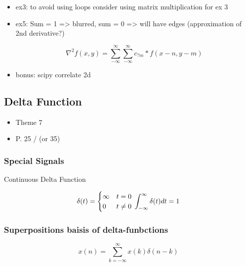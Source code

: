 \documentclass[
]{article}
\author{}
\date{}
\providecommand{\tightlist}{%
  \setlength{\itemsep}{0pt}\setlength{\parskip}{0pt}}
\begin{document}
\begin{itemize}
\item
  ex3: to avoid using loops consider using matrix multiplication for ex
  3
\item
  ex5: Sum = 1 =\textgreater{} blurred, sum = 0 =\textgreater{} will
  have edges (approximation of 2nd derivative?)

  \[ \nabla^2{f(x,y) = \sum_{-\infty}^{\infty}{ \sum_{-\infty}^{\infty}{c_{?m}*f(x-n, y-m) }}} \]
\item
  bonus: scipy correlate 2d
\end{itemize}

\hypertarget{delta-function}{%
\subsection{Delta Function}\label{delta-function}}

\begin{itemize}
\tightlist
\item
  Theme 7
\item
  P. 25 / (or 35)
\end{itemize}

\hypertarget{special-signals}{%
\subsubsection{Special Signals}\label{special-signals}}

Continuous Delta Function

\begin{equation*}
    \delta(t) = \begin{cases}
        \infty & t = 0 \\
        0 & t \neq 0
    \end{cases}
    \\ \int_{-\infty}^{\infty}{\delta(t)dt} = 1
\end{equation*}

\hypertarget{superpositions-baisis-of-delta-funbctions}{%
\subsubsection{Superpositions baisis of
delta-funbctions}\label{superpositions-baisis-of-delta-funbctions}}

\[
    x(n) = \sum_{k=-\infty}^{\infty}{x(k)\delta(n-k)}
\]
\end{document}
